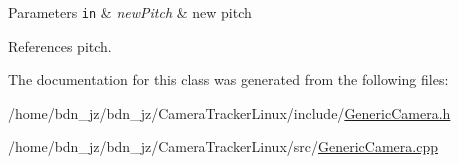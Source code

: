 \begin{DoxyParams}[1]{Parameters}
\mbox{\tt in}  & {\em new\+Pitch} & new pitch \\
\hline
\end{DoxyParams}


References pitch.



The documentation for this class was generated from the following files\+:\begin{DoxyCompactItemize}
\item 
/home/bdn\+\_\+jz/bdn\+\_\+jz/\+Camera\+Tracker\+Linux/include/\hyperlink{GenericCamera_8h}{Generic\+Camera.\+h}\item 
/home/bdn\+\_\+jz/bdn\+\_\+jz/\+Camera\+Tracker\+Linux/src/\hyperlink{GenericCamera_8cpp}{Generic\+Camera.\+cpp}\end{DoxyCompactItemize}
